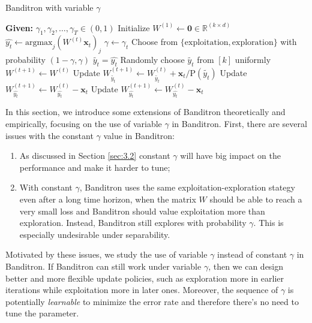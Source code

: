 \documentclass{article}
\begin{document}
\begin{algorithm}[bt]
    \caption{Banditron with variable $\gamma$}\label{alg:vari}
 \begin{algorithmic}
    \STATE \textbf{Given:} $\gamma_1,\gamma_2,\ldots,\gamma_T\in(0,1)$
    \STATE Initialize $W^{(1)}\leftarrow\mathbf{0}\in\mathbb{R}^{(k\times d)}$
    \STATE $\hat{y_t}\leftarrow\text{argmax}_j(W^{(t)}\mathbf{x}_t)_j$
    \STATE $\gamma\leftarrow \gamma_t$
    \STATE Choose from $\{\text{exploitation},\text{exploration}\}$ with probability $(1-\gamma,\gamma)$
    \STATE $\tilde{y_t}=\hat{y_t}$
    \ELSE
    \STATE Randomly choose $\tilde{y_t}$ from $[k]$ uniformly
    \ENDIF
    \STATE $W^{(t+1)}\leftarrow W^{(t)}$
        \STATE Update $W^{(t+1)}_{\tilde{y_t}}\leftarrow W^{(t)}_{\tilde{y_t}}+\mathbf{x}_t/\text{P}(\tilde{y_t})$
        \STATE Update $W^{(t+1)}_{\hat{y_t}} \leftarrow W^{(t)}_{\hat{y_t}} - \mathbf{x}_t$
    \ELSE
    \STATE Update $W^{(t+1)}_{\hat{y_t}} \leftarrow W^{(t)}_{\hat{y_t}} - \mathbf{x}_t$
    \ENDIF
    \ENDFOR
 \end{algorithmic}
\end{algorithm}

In this section, we introduce some extensions of Banditron theoretically and empirically, focusing on the use of variable $\gamma$ in Banditron. First, there are several issues with the constant $\gamma$ value in Banditron:
\begin{enumerate}
    \item As discussed in Section \ref{sec:3.2} constant $\gamma$ will have big impact on the performance and make it harder to tune;
    \item With constant $\gamma$, Banditron uses the same exploitation-exploration stategy even after a long time horizon, when the matrix $W$ should be able to reach a very small loss and Banditron should value exploitation more than exploration. Instead, Banditron still explores with probability $\gamma$. This is especially undesirable under separability.
\end{enumerate}

Motivated by these issues, we study the use of variable $\gamma$ instead of constant $\gamma$ in Banditron. If Banditron can still work under variable $\gamma$, then we can design better and more flexible update policies, such as exploration more in earlier iterations while exploitation more in later ones. Moreover, the sequence of $\gamma$ is potentially \textit{learnable} to minimize the error rate and therefore there's no need to tune the parameter.
\end{document}
